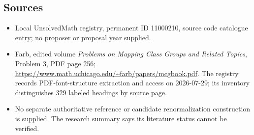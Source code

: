 \documentclass[11pt]{article}
\begin{document}
\subsection{Sources}
\begin{itemize}
\item Local UnsolvedMath registry, permanent ID 11000210, source code catalogue entry; no proposer or proposal year supplied.
\item Farb, edited volume \emph{Problems on Mapping Class Groups and Related Topics}, Problem 3, PDF page 256; \url{https://www.math.uchicago.edu/~farb/papers/mcgbook.pdf}. The registry records PDF-font-structure extraction and access on 2026-07-29; its inventory distinguishes 329 labeled headings by source page.
\item No separate authoritative reference or candidate renormalization construction is supplied. The research summary says its literature status cannot be verified.
\end{itemize}
\end{document}
